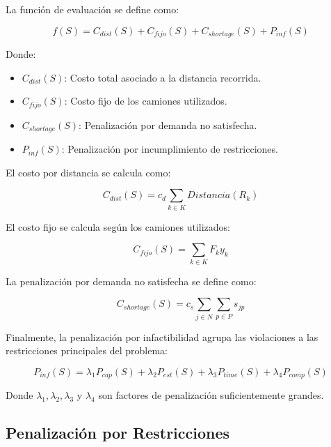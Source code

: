 La función de evaluación se define como:

\begin{equation}
f(S) = C_{dist}(S) + C_{fijo}(S) + C_{shortage}(S) + P_{inf}(S)
\end{equation}

Donde:

\begin{itemize}
    \item $C_{dist}(S)$: Costo total asociado a la distancia recorrida.
    \item $C_{fijo}(S)$: Costo fijo de los camiones utilizados.
    \item $C_{shortage}(S)$: Penalización por demanda no satisfecha.
    \item $P_{inf}(S)$: Penalización por incumplimiento de restricciones.
\end{itemize}

El costo por distancia se calcula como:

\begin{equation}
C_{dist}(S) = c_d \sum_{k \in K} Distancia(R_k)
\end{equation}

El costo fijo se calcula según los camiones utilizados:

\begin{equation}
C_{fijo}(S) = \sum_{k \in K} F_k y_k
\end{equation}

La penalización por demanda no satisfecha se define como:

\begin{equation}
C_{shortage}(S) = c_s \sum_{j \in N} \sum_{p \in P} s_{jp}
\end{equation}

Finalmente, la penalización por infactibilidad agrupa las violaciones a las restricciones principales del problema:

\begin{equation}
P_{inf}(S) = \lambda_1 P_{cap}(S) + \lambda_2 P_{est}(S) + \lambda_3 P_{time}(S) + \lambda_4 P_{comp}(S)
\end{equation}

Donde $\lambda_1, \lambda_2, \lambda_3$ y $\lambda_4$ son factores de penalización suficientemente grandes.

\subsection{Penalización por Restricciones}

